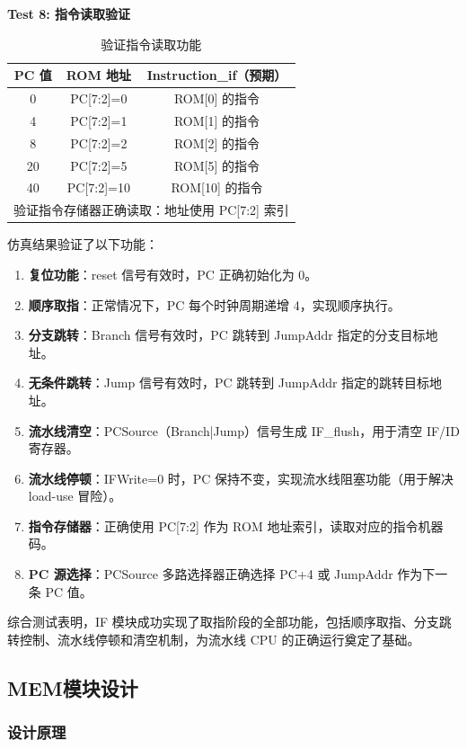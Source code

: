 \documentclass[12pt,a4paper]{article}
\begin{document}
\textbf{Test 8: 指令读取验证}

\begin{table}[H]
\centering
\begin{tabular}{|c|c|c|}
\hline
PC 值 & ROM 地址 & Instruction\_if（预期） \\ \hline
0 & PC[7:2]=0 & ROM[0] 的指令 \\ \hline
4 & PC[7:2]=1 & ROM[1] 的指令 \\ \hline
8 & PC[7:2]=2 & ROM[2] 的指令 \\ \hline
20 & PC[7:2]=5 & ROM[5] 的指令 \\ \hline
40 & PC[7:2]=10 & ROM[10] 的指令 \\ \hline
\multicolumn{3}{|c|}{验证指令存储器正确读取：地址使用 PC[7:2] 索引} \\ \hline
\end{tabular}
\caption{验证指令读取功能}
\end{table}

仿真结果验证了以下功能：
\begin{enumerate}
    \item \textbf{复位功能}：reset 信号有效时，PC 正确初始化为 0。
    \item \textbf{顺序取指}：正常情况下，PC 每个时钟周期递增 4，实现顺序执行。
    \item \textbf{分支跳转}：Branch 信号有效时，PC 跳转到 JumpAddr 指定的分支目标地址。
    \item \textbf{无条件跳转}：Jump 信号有效时，PC 跳转到 JumpAddr 指定的跳转目标地址。
    \item \textbf{流水线清空}：PCSource（Branch|Jump）信号生成 IF\_flush，用于清空 IF/ID 寄存器。
    \item \textbf{流水线停顿}：IFWrite=0 时，PC 保持不变，实现流水线阻塞功能（用于解决 load-use 冒险）。
    \item \textbf{指令存储器}：正确使用 PC[7:2] 作为 ROM 地址索引，读取对应的指令机器码。
    \item \textbf{PC 源选择}：PCSource 多路选择器正确选择 PC+4 或 JumpAddr 作为下一条 PC 值。
\end{enumerate}

综合测试表明，IF 模块成功实现了取指阶段的全部功能，包括顺序取指、分支跳转控制、流水线停顿和清空机制，为流水线 CPU 的正确运行奠定了基础。

\clearpage
\subsection{MEM模块设计}
\subsubsection{设计原理}
\end{document}
